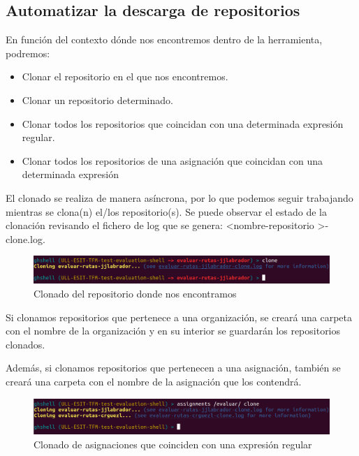 \subsection{Automatizar la descarga de repositorios}
\label{subsec:3.1.3}  
        	
    En función del contexto dónde nos encontremos dentro de la herramienta, podremos:
    \begin{itemize}
    	\item Clonar el repositorio en el que nos encontremos.
    	\item Clonar un repositorio determinado.
	    \item Clonar todos los repositorios que coincidan con una determinada expresión regular.
	    \item Clonar todos los repositorios de una asignación que coincidan con una determinada expresión
    \end{itemize}
    
    El clonado se realiza de manera asíncrona, por lo que podemos seguir trabajando mientras se clona(n) el/los repositorio(s). Se puede observar el estado de la clonación revisando el fichero de log que se genera: \textless nombre-repositorio \textgreater -clone.log.
    
    	\begin{figure}[H]
		\begin{center}
		\includegraphics[width=1\textwidth]{images/ghshell6-3}
		\caption{Clonado del repositorio donde nos encontramos}
		\label{fig:ghshell6-3}
		\end{center}
		\end{figure}	

    Si clonamos repositorios que pertenece a una organización, se creará una carpeta con el nombre de la organización y en su interior se guardarán los repositorios clonados.
    		
	Además, si clonamos repositorios que pertenecen a una asignación, también se creará una carpeta con el nombre de la asignación que los contendrá.
	
        \begin{figure}[H]
		\begin{center}
		\includegraphics[width=1\textwidth]{images/ghshell6-1}
		\caption{Clonado de asignaciones que coinciden con una expresión regular}
		\label{fig:ghshell6-1}
		\end{center}
		\end{figure}	
		
